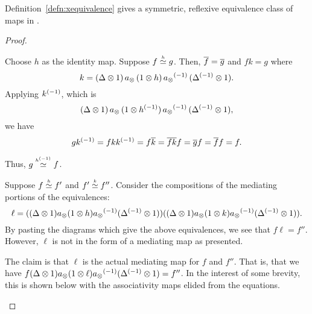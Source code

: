 \begin{lemma}\label{lem:mediating_map_equivalence_is_symmetric_reflexive_and_transitive}
  Definition~\ref{defn:xequivalence} gives a symmetric, reflexive equivalence class of maps in \X.
\end{lemma}
\begin{proof}
  \prepprooflist
  \begin{description}
     Choose $h$ as the identity map.
     Suppose $f\overset{\scriptscriptstyle h}{\simeq}g$. Then, $\overline{f} = \overline{g}$ and $f k = g$ where
      \[
        k = (\Delta\otimes 1) \, a_{\otimes}\, (1\otimes h)\, {a_{\otimes}}^{(-1)}\,({\Delta}^{(-1)}\otimes 1).
      \] Applying ${k}^{(-1)}$,
      which is
      \[
        (\Delta\otimes 1) \, a_{\otimes}\, (1\otimes{h}^{(-1)})\, {a_{\otimes}}^{(-1)}\,({\Delta}^{(-1)}\otimes 1),
      \]
      we have
      \[
        g {k}^{(-1)} = f k {k}^{(-1)} = f \overline{k} = \overline{f k} f
        = \overline{g} f = \overline{f} f = f.
      \]

      Thus, $g\overset{\scriptscriptstyle {h}^{(-1)}}{\simeq} f$.

     Suppose $f\overset{\scriptscriptstyle h}{\simeq} f'$ and $f' \overset{\scriptscriptstyle k}{\simeq} f''$. Consider the
      compositions of the mediating portions of the equivalences:
      \[
        \ell = ((\Delta \otimes 1)  a_{\otimes}  (1 \otimes h ) {a_{\otimes}}^{(-1)} ({\Delta}^{(-1)}\otimes 1))
          ( (\Delta \otimes 1) a_{\otimes}  (1 \otimes k) {a_{\otimes}}^{(-1)} ({\Delta}^{(-1)}\otimes 1)).
      \]
      By pasting the diagrams which give the above equivalences, we see that $f \ell = f''$.
      However, $\ell$ is not in the form of a mediating map as presented.

      The claim is that $\ell$ is the actual mediating map for $f$ and $f''$. That is, that we have
      $f(\Delta \otimes 1)a_{\otimes}(1 \otimes \ell){a_{\otimes}}^{(-1)}({\Delta}^{(-1)}\otimes1) = f''$. In the interest of some
      brevity, this is shown below with the associativity maps elided from the equations.


\end{description}
\end{proof}
